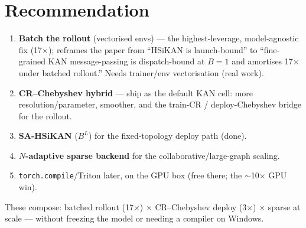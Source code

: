 \documentclass[11pt]{article}
\begin{document}
\section{Recommendation}
\begin{enumerate}\itemsep1pt
\item \textbf{Batch the rollout} (vectorised envs) --- the highest-leverage, model-agnostic fix (17$\times$);
  reframes the paper from ``HSiKAN is launch-bound'' to ``fine-grained KAN message-passing is dispatch-bound at
  $B{=}1$ and amortises 17$\times$ under batched rollout.'' Needs trainer/env vectorisation (real work).
\item \textbf{CR--Chebyshev hybrid} --- ship as the default KAN cell: more resolution/parameter, smoother, and the
  train-CR / deploy-Chebyshev bridge for the rollout.
\item \textbf{SA-HSiKAN} ($B^{L}$) for the fixed-topology deploy path (done).
\item \textbf{$N$-adaptive sparse backend} for the collaborative/large-graph scaling.
\item \texttt{torch.compile}/Triton later, on the GPU box (free there; the $\sim$10$\times$ GPU win).
\end{enumerate}
\noindent These compose: batched rollout (17$\times$) $\times$ CR--Chebyshev deploy (3$\times$) $\times$ sparse at
scale --- without freezing the model or needing a compiler on Windows.
\end{document}
